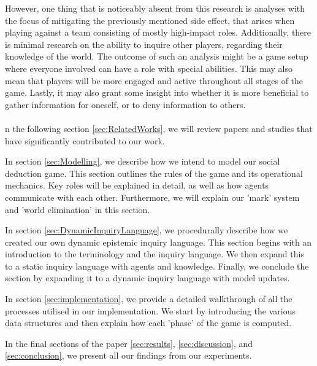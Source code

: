 However, one thing that is noticeably absent from this research is analyses
with the focus of mitigating the previously mentioned side effect, that arises
when playing against a team consisting of mostly high-impact roles.
Additionally, there is minimal research on the ability to inquire other
players, regarding their knowledge of the world. The outcome of such an
analysis might be a game setup where everyone involved can have a role with
special abilities. This may also mean that players will be more engaged and
active throughout all stages of the game. Lastly, it may also grant some
insight into whether it is more beneficial to gather information for oneself,
or to deny information to others.\\ \\

n the following section \ref{sec:RelatedWorks}, we will review papers and studies that have significantly contributed to our work.

In section \ref{sec:Modelling}, we describe how we intend to model our social deduction game. This section outlines the rules of the game and its operational mechanics. Key roles will be explained in detail, as well as how agents communicate with each other. Furthermore, we will explain our 'mark' system and 'world elimination' in this section.

In section \ref{sec:DynamicInquiryLanguage}, we procedurally describe how we created our own dynamic epistemic inquiry language. This section begins with an introduction to the terminology and the inquiry language. We then expand this to a static inquiry language with agents and knowledge. Finally, we conclude the section by expanding it to a dynamic inquiry language with model updates.

In section \ref{sec:implementation}, we provide a detailed walkthrough of all the processes utilised in our implementation. We start by introducing the various data structures and then explain how each 'phase' of the game is computed. 

In the final sections of the paper \ref{sec:results}, \ref{sec:discussion}, and \ref{sec:conclusion}, we present all our findings from our experiments.